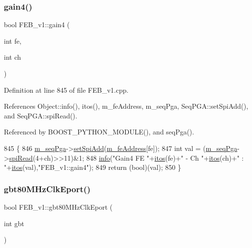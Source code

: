 \subsubsection{\texorpdfstring{gain4()}{gain4()}}
{\footnotesize\ttfamily bool F\+E\+B\+\_\+v1\+::gain4 (\begin{DoxyParamCaption}\item[{int}]{fe,  }\item[{int}]{ch }\end{DoxyParamCaption})}



Definition at line 845 of file F\+E\+B\+\_\+v1.\+cpp.



References Object\+::info(), itos(), m\+\_\+fe\+Address, m\+\_\+seq\+Pga, Seq\+P\+G\+A\+::set\+Spi\+Add(), and Seq\+P\+G\+A\+::spi\+Read().



Referenced by B\+O\+O\+S\+T\+\_\+\+P\+Y\+T\+H\+O\+N\+\_\+\+M\+O\+D\+U\+L\+E(), and seq\+Pga().


\begin{DoxyCode}
845                                    \{
846   \hyperlink{classFEB__v1_a6c7804ac86796f233a8393043adf2e77}{m\_seqPga}->\hyperlink{classSeqPGA_ac998ce3a6d9b5f2e88cc8393f8c1df53}{setSpiAdd}(\hyperlink{classFEB__v1_a4e1945c2d5b434125f375e9d0fc6d99f}{m\_feAddress}[fe]);
847   \textcolor{keywordtype}{int} val = (\hyperlink{classFEB__v1_a6c7804ac86796f233a8393043adf2e77}{m\_seqPga}->\hyperlink{classSeqPGA_ab3d0e5e5d4014bc7a92588a76b8713d4}{spiRead}(4+ch)>>11)&1;
848   \hyperlink{classObject_a644fd329ea4cb85f54fa6846484b84a8}{info}(\textcolor{stringliteral}{"Gain4 FE "}+\hyperlink{Tools_8h_af330027dbdafb9a30768b3613c553e60}{itos}(fe)+\textcolor{stringliteral}{" - Ch "}+\hyperlink{Tools_8h_af330027dbdafb9a30768b3613c553e60}{itos}(ch)+\textcolor{stringliteral}{" : "}+\hyperlink{Tools_8h_af330027dbdafb9a30768b3613c553e60}{itos}(val),\textcolor{stringliteral}{"FEB\_v1::gain4"});
849   \textcolor{keywordflow}{return} (\textcolor{keywordtype}{bool})(val);
850 \}
\end{DoxyCode}
\mbox{\label{classFEB__v1_ac22b1ffdc20be66330a66ebd12cd13f1}} 
\subsubsection{\texorpdfstring{gbt80\+M\+Hz\+Clk\+Eport()}{gbt80MHzClkEport()}}
{\footnotesize\ttfamily bool F\+E\+B\+\_\+v1\+::gbt80\+M\+Hz\+Clk\+Eport (\begin{DoxyParamCaption}\item[{int}]{gbt }\end{DoxyParamCaption})}



